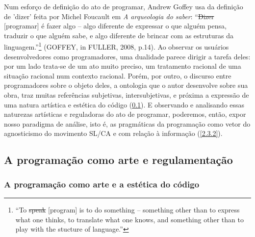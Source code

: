 Num esforço de definição do ato de programar, Andrew Goffey usa da definição de 'dizer' feita por Michel Foucault em \emph{A arqueologia do saber}: “\st{Dizer} [programar] é fazer algo – algo diferente de expressar o que alguém pensa, traduzir o que alguém sabe, e algo diferente de brincar com as estruturas da linguagem.”\footnote{“To \st{speak} [program] is to do something – something other than to express what one thinks, to translate what one knows, and something other than to play with the stucture of language.”} (GOFFEY, in FULLER, 2008, p.14). Ao observar os usuários desenvolvedores como programadores, uma dualidade parece dirigir a tarefa deles: por um lado trata-se de um ato muito preciso, um tratamento racional de uma situação racional num contexto racional. Porém, por outro, o discurso entre programadores sobre o objeto deles, a ontologia que o autor desenvolve sobre sua obra, traz muitas referências subjetivas, intersubjetivas, e próxima a expressão de uma natura artística e estética do código (\ref{2.3.1}). E observando e analisando essas naturezas artísticas e reguladoras do ato de programar, poderemos, então, expor nosso paradigma de análise, isto é, as pragmáticas da programação como vetor do agnosticismo do movimento SL/CA e com relação à informação (\ref{2.3.2}).

\subsection{A programação como arte e regulamentação} \label{2.3.1}

\subsubsection{A programação como arte e a estética do código} \label{2.3.1.a}

